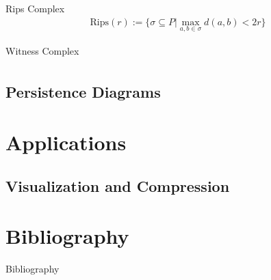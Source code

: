 \begin{frame}
	\begin{block}{Rips Complex}
		\begin{align*}
			\text{Rips}(r) := \{ \sigma \subseteq P
				| \max_{a,b \in \sigma} d(a,b) < 2r \}
		\end{align*}
		\cite{wagner}
	\end{block}
\end{frame}

\begin{frame}
	\begin{block}{Witness Complex}
		\begin{align*}
		\end{align*}
		\cite{desilva}
	\end{block}
\end{frame}

\subsection{Persistence Diagrams}
\begin{frame}
\end{frame}

\section{Applications}
\subsection{Visualization and Compression}
\begin{frame}
\end{frame}

\section*{Bibliography}
\begin{frame}{Bibliography}
	\nocite{wagner}
	\nocite{hatcher}
	\nocite{fraleigha}
	\nocite{singh}
	\begingroup
	\renewcommand{\section}[2]{}%
	
	\endgroup
\end{frame}





